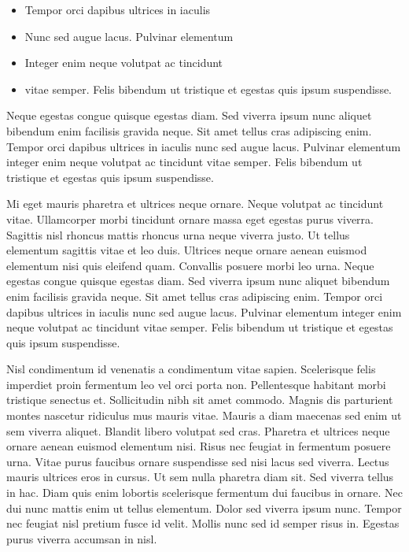 \documentclass[11pt,]{article}
\providecommand{\tightlist}{%
  \setlength{\itemsep}{0pt}\setlength{\parskip}{0pt}}
\begin{document}
\begin{itemize}
\tightlist
\item
  Tempor orci dapibus ultrices in iaculis
\item
  Nunc sed augue lacus. Pulvinar elementum
\item
  Integer enim neque volutpat ac tincidunt
\item
  vitae semper. Felis bibendum ut tristique et egestas quis ipsum
  suspendisse.
\end{itemize}

Neque egestas congue quisque egestas diam. Sed viverra ipsum nunc
aliquet bibendum enim facilisis gravida neque. Sit amet tellus cras
adipiscing enim. Tempor orci dapibus ultrices in iaculis nunc sed augue
lacus. Pulvinar elementum integer enim neque volutpat ac tincidunt vitae
semper. Felis bibendum ut tristique et egestas quis ipsum suspendisse.

Mi eget mauris pharetra et ultrices neque ornare. Neque volutpat ac
tincidunt vitae. Ullamcorper morbi tincidunt ornare massa eget egestas
purus viverra. Sagittis nisl rhoncus mattis rhoncus urna neque viverra
justo. Ut tellus elementum sagittis vitae et leo duis. Ultrices neque
ornare aenean euismod elementum nisi quis eleifend quam. Convallis
posuere morbi leo urna. Neque egestas congue quisque egestas diam. Sed
viverra ipsum nunc aliquet bibendum enim facilisis gravida neque. Sit
amet tellus cras adipiscing enim. Tempor orci dapibus ultrices in
iaculis nunc sed augue lacus. Pulvinar elementum integer enim neque
volutpat ac tincidunt vitae semper. Felis bibendum ut tristique et
egestas quis ipsum suspendisse.

Nisl condimentum id venenatis a condimentum vitae sapien. Scelerisque
felis imperdiet proin fermentum leo vel orci porta non. Pellentesque
habitant morbi tristique senectus et. Sollicitudin nibh sit amet
commodo. Magnis dis parturient montes nascetur ridiculus mus mauris
vitae. Mauris a diam maecenas sed enim ut sem viverra aliquet. Blandit
libero volutpat sed cras. Pharetra et ultrices neque ornare aenean
euismod elementum nisi. Risus nec feugiat in fermentum posuere urna.
Vitae purus faucibus ornare suspendisse sed nisi lacus sed viverra.
Lectus mauris ultrices eros in cursus. Ut sem nulla pharetra diam sit.
Sed viverra tellus in hac. Diam quis enim lobortis scelerisque fermentum
dui faucibus in ornare. Nec dui nunc mattis enim ut tellus elementum.
Dolor sed viverra ipsum nunc. Tempor nec feugiat nisl pretium fusce id
velit. Mollis nunc sed id semper risus in. Egestas purus viverra
accumsan in nisl.
\end{document}
